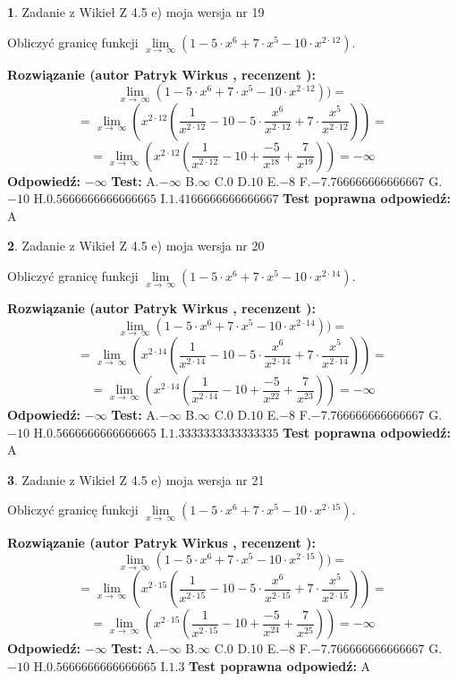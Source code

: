 \documentclass[12pt, a4paper]{article}
\theoremstyle{definition} %
\newtheorem{zad}{}
\newcommand{\zadStart}[1]{\begin{zad}#1\newline}
\newcommand{\zadStop}{\end{zad}}
\newcommand{\rozwStart}[2]{\noindent \textbf{Rozwiązanie (autor #1 , recenzent #2): }\newline}
\newcommand{\rozwStop}{\newline}
\newcommand{\odpStart}{\noindent \textbf{Odpowiedź:}\newline}
\newcommand{\odpStop}{\newline}
\newcommand{\testStart}{\noindent \textbf{Test:}\newline}
\newcommand{\testStop}{\newline}
\newcommand{\kluczStart}{\noindent \textbf{Test poprawna odpowiedź:}\newline}
\newcommand{\kluczStop}{\newline}
\begin{document}
\zadStart{Zadanie z Wikieł Z 4.5 e) moja wersja nr 19}


Obliczyć granicę funkcji  $\lim\limits_{x\to\ \infty}(1 - 5 \cdot x^{6}+7 \cdot x^{5}- 10 \cdot x^{2\cdot12})$.
\zadStop
\rozwStart{Patryk Wirkus}{}
$$\lim\limits_{x\to\ \infty}(1 - 5 \cdot x^{6}+7 \cdot x^{5}- 10 \cdot x^{2\cdot12}))=$$
$$=\lim\limits_{x\to\ \infty}(x^{2\cdot12}(\frac{1}{x^{2\cdot12}}-10 -5 \cdot \frac{x^{6}}{x^{2\cdot12}}+7 \cdot \frac{x^{5}}{x^{2\cdot12}}))=$$
$$=\lim\limits_{x\to\ \infty}(x^{2\cdot12}(\frac{1}{x^{2\cdot12}}-10 + \frac{-5}{x^{18}}+ \frac{7}{x^{19}}))=-\infty$$
\rozwStop
\odpStart
$-\infty$
\odpStop
\testStart
A.$-\infty$ B.$\infty$ C.$0$ D.$10$ E.$-8$
F.$-7.766666666666667$ G.$-10$
H.$0.5666666666666665$
I.$1.4166666666666667$
\testStop
\kluczStart
A
\kluczStop



\zadStart{Zadanie z Wikieł Z 4.5 e) moja wersja nr 20}


Obliczyć granicę funkcji  $\lim\limits_{x\to\ \infty}(1 - 5 \cdot x^{6}+7 \cdot x^{5}- 10 \cdot x^{2\cdot14})$.
\zadStop
\rozwStart{Patryk Wirkus}{}
$$\lim\limits_{x\to\ \infty}(1 - 5 \cdot x^{6}+7 \cdot x^{5}- 10 \cdot x^{2\cdot14}))=$$
$$=\lim\limits_{x\to\ \infty}(x^{2\cdot14}(\frac{1}{x^{2\cdot14}}-10 -5 \cdot \frac{x^{6}}{x^{2\cdot14}}+7 \cdot \frac{x^{5}}{x^{2\cdot14}}))=$$
$$=\lim\limits_{x\to\ \infty}(x^{2\cdot14}(\frac{1}{x^{2\cdot14}}-10 + \frac{-5}{x^{22}}+ \frac{7}{x^{23}}))=-\infty$$
\rozwStop
\odpStart
$-\infty$
\odpStop
\testStart
A.$-\infty$ B.$\infty$ C.$0$ D.$10$ E.$-8$
F.$-7.766666666666667$ G.$-10$
H.$0.5666666666666665$
I.$1.3333333333333335$
\testStop
\kluczStart
A
\kluczStop



\zadStart{Zadanie z Wikieł Z 4.5 e) moja wersja nr 21}


Obliczyć granicę funkcji  $\lim\limits_{x\to\ \infty}(1 - 5 \cdot x^{6}+7 \cdot x^{5}- 10 \cdot x^{2\cdot15})$.
\zadStop
\rozwStart{Patryk Wirkus}{}
$$\lim\limits_{x\to\ \infty}(1 - 5 \cdot x^{6}+7 \cdot x^{5}- 10 \cdot x^{2\cdot15}))=$$
$$=\lim\limits_{x\to\ \infty}(x^{2\cdot15}(\frac{1}{x^{2\cdot15}}-10 -5 \cdot \frac{x^{6}}{x^{2\cdot15}}+7 \cdot \frac{x^{5}}{x^{2\cdot15}}))=$$
$$=\lim\limits_{x\to\ \infty}(x^{2\cdot15}(\frac{1}{x^{2\cdot15}}-10 + \frac{-5}{x^{24}}+ \frac{7}{x^{25}}))=-\infty$$
\rozwStop
\odpStart
$-\infty$
\odpStop
\testStart
A.$-\infty$ B.$\infty$ C.$0$ D.$10$ E.$-8$
F.$-7.766666666666667$ G.$-10$
H.$0.5666666666666665$
I.$1.3$
\testStop
\kluczStart
A
\kluczStop
\end{document}
